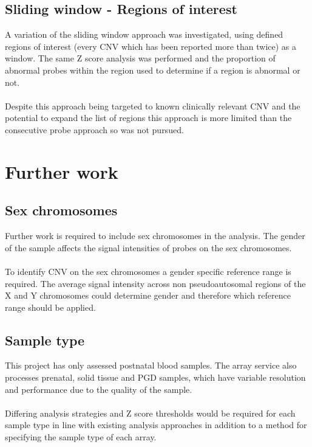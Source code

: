\subsection{Sliding window - Regions of interest}
A variation of the sliding window approach was investigated, using defined regions of interest (every CNV which has been reported more than twice) as a window. The same Z score analysis was performed and the proportion of abnormal probes within the region used to determine if a region is abnormal or not.
\paragraph*{}
Despite this approach being targeted to known clinically relevant CNV and the potential to expand the list of regions this approach is more limited than the consecutive probe approach so was not pursued.

\section{Further work}
\subsection{Sex chromosomes}
Further work is required to include sex chromosomes in the analysis. The gender of the sample affects the signal intensities of probes on the sex chromosomes. 
\paragraph*{}
To identify CNV on the sex chromosomes a gender specific reference range is required. The average signal intensity across non pseudoautosomal regions of the X and Y chromosomes could determine gender and therefore which reference range should be applied.
\subsection{Sample type}
This project has only assessed postnatal blood samples. The array service also processes prenatal, solid tissue and \ac{PGD} samples, which have variable resolution and performance due to the quality of the sample. 
\paragraph*{}
Differing analysis strategies and Z score thresholds would be required for each sample type in line with existing analysis approaches in addition to a method for specifying the sample type of each array.
